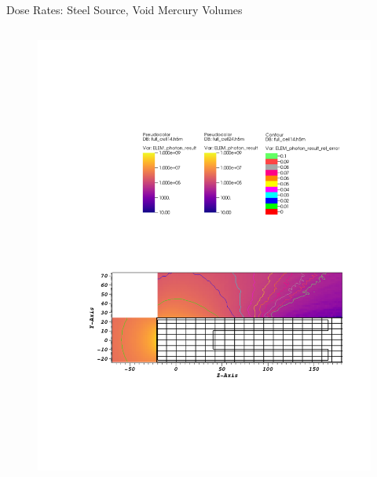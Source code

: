 \documentclass{beamer}
\begin{document}
\begin{frame}{Dose Rates: Steel Source, Void Mercury Volumes}
\begin{columns}[T]
        \begin{figure}
                \includegraphics[scale=0.49,trim={20cm 16cm 7cm 5cm},clip]{figs/dose_steel_cell_void.pdf}
        \end{figure}

\end{columns}
\end{frame}
\end{document}
